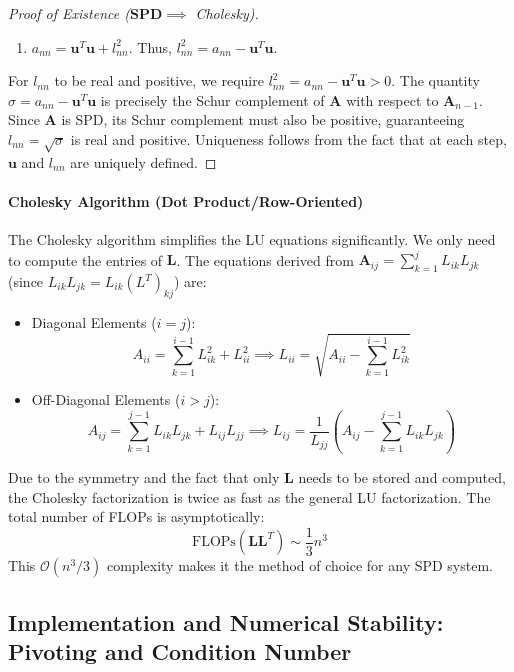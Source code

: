 \begin{proof}[Proof of Existence ($\mathbf{SPD} \implies$ Cholesky)]
\begin{enumerate}
    \item $a_{nn} = \mathbf{u}^T \mathbf{u} + l_{nn}^2$. Thus, $l_{nn}^2 = a_{nn} - \mathbf{u}^T \mathbf{u}$.
\end{enumerate}
For $l_{nn}$ to be real and positive, we require $l_{nn}^2 = a_{nn} - \mathbf{u}^T \mathbf{u} > 0$.
The quantity $\sigma = a_{nn} - \mathbf{u}^T \mathbf{u}$ is precisely the Schur complement of $\mathbf{A}$ with respect to $\mathbf{A}_{n-1}$. Since $\mathbf{A}$ is SPD, its Schur complement must also be positive, guaranteeing $l_{nn} = \sqrt{\sigma}$ is real and positive. Uniqueness follows from the fact that at each step, $\mathbf{u}$ and $l_{nn}$ are uniquely defined.
\end{proof}

\paragraph{Cholesky Algorithm (Dot Product/Row-Oriented)}
The Cholesky algorithm simplifies the LU equations significantly. We only need to compute the entries of $\mathbf{L}$. The equations derived from $\mathbf{A}_{ij} = \sum_{k=1}^{j} L_{ik} L_{jk}$ (since $L_{ik} L_{jk} = L_{ik} (L^T)_{kj}$) are:
\begin{itemize}
    \item Diagonal Elements ($i=j$):
    \[ A_{ii} = \sum_{k=1}^{i-1} L_{ik}^2 + L_{ii}^2 \implies L_{ii} = \sqrt{A_{ii} - \sum_{k=1}^{i-1} L_{ik}^2} \]
    \item Off-Diagonal Elements ($i>j$):
    \[ A_{ij} = \sum_{k=1}^{j-1} L_{ik} L_{jk} + L_{ij} L_{jj} \implies L_{ij} = \frac{1}{L_{jj}} \left( A_{ij} - \sum_{k=1}^{j-1} L_{ik} L_{jk} \right) \]
\end{itemize}

\begin{proposition}
Due to the symmetry and the fact that only $\mathbf{L}$ needs to be stored and computed, the Cholesky factorization is twice as fast as the general LU factorization. The total number of FLOPs is asymptotically:
\[ \text{FLOPs}(\mathbf{L}\mathbf{L}^T) \sim \frac{1}{3} n^3 \]
This $\mathcal{O}(n^3/3)$ complexity makes it the method of choice for any SPD system.
\end{proposition}

\subsection{Implementation and Numerical Stability: Pivoting and Condition Number}

